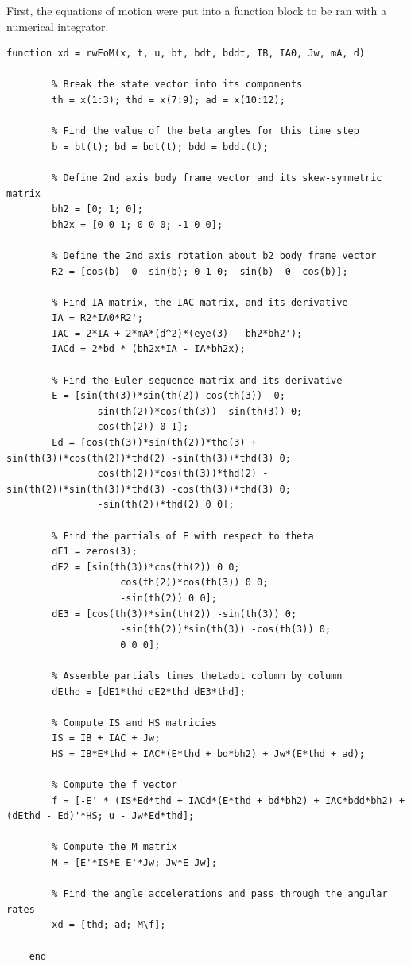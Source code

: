 \documentclass[titlepage]{article}
\begin{document}
First, the equations of motion were put into a function block to be ran with a numerical integrator.
\begin{lstlisting}[label=lst:rwEoM.m,caption=Implementation of the spacecraft EoM.]
	function xd = rwEoM(x, t, u, bt, bdt, bddt, IB, IA0, Jw, mA, d)
	
		% Break the state vector into its components
		th = x(1:3); thd = x(7:9); ad = x(10:12);
		
		% Find the value of the beta angles for this time step
		b = bt(t); bd = bdt(t); bdd = bddt(t);
		
		% Define 2nd axis body frame vector and its skew-symmetric matrix
		bh2 = [0; 1; 0];
		bh2x = [0 0 1; 0 0 0; -1 0 0];
		
		% Define the 2nd axis rotation about b2 body frame vector
		R2 = [cos(b)  0  sin(b); 0 1 0; -sin(b)  0  cos(b)];
		
		% Find IA matrix, the IAC matrix, and its derivative
		IA = R2*IA0*R2';
		IAC = 2*IA + 2*mA*(d^2)*(eye(3) - bh2*bh2');
		IACd = 2*bd * (bh2x*IA - IA*bh2x);
		
		% Find the Euler sequence matrix and its derivative
		E = [sin(th(3))*sin(th(2)) cos(th(3))  0;
				sin(th(2))*cos(th(3)) -sin(th(3)) 0;
				cos(th(2)) 0 1];
		Ed = [cos(th(3))*sin(th(2))*thd(3) + sin(th(3))*cos(th(2))*thd(2) -sin(th(3))*thd(3) 0;
				cos(th(2))*cos(th(3))*thd(2) - sin(th(2))*sin(th(3))*thd(3) -cos(th(3))*thd(3) 0;
				-sin(th(2))*thd(2) 0 0];
		
		% Find the partials of E with respect to theta
		dE1 = zeros(3);
		dE2 = [sin(th(3))*cos(th(2)) 0 0;
					cos(th(2))*cos(th(3)) 0 0;
					-sin(th(2)) 0 0];
		dE3 = [cos(th(3))*sin(th(2)) -sin(th(3)) 0;
					-sin(th(2))*sin(th(3)) -cos(th(3)) 0;
					0 0 0];
		
		% Assemble partials times thetadot column by column
		dEthd = [dE1*thd dE2*thd dE3*thd];
		
		% Compute IS and HS matricies
		IS = IB + IAC + Jw;
		HS = IB*E*thd + IAC*(E*thd + bd*bh2) + Jw*(E*thd + ad);
		
		% Compute the f vector
		f = [-E' * (IS*Ed*thd + IACd*(E*thd + bd*bh2) + IAC*bdd*bh2) + 	(dEthd - Ed)'*HS; u - Jw*Ed*thd];
		
		% Compute the M matrix
		M = [E'*IS*E E'*Jw; Jw*E Jw];
		
		% Find the angle accelerations and pass through the angular rates
		xd = [thd; ad; M\f];
	
	end
\end{lstlisting}
\end{document}
